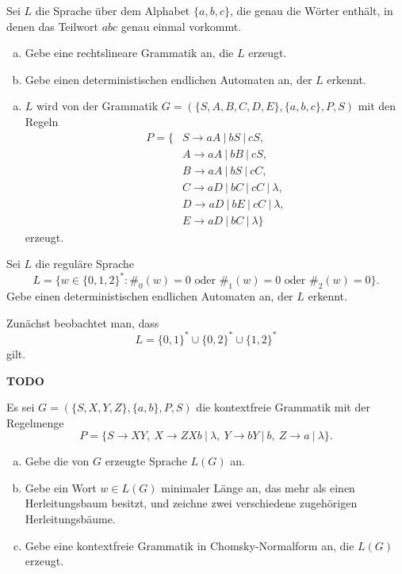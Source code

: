 \documentclass[german,headsepline]{scrartcl}
\theoremstyle{definition}
\begin{document}
	\begin{question}
		Sei $L$ die Sprache über dem Alphabet $\{a,b,c\}$, die genau die Wörter enthält,
		in denen das Teilwort $abc$ genau einmal vorkommt.
		\begin{enumerate}[(a)]
			\item Gebe eine rechtslineare Grammatik an, die $L$ erzeugt.
			\item Gebe einen deterministischen endlichen Automaten an, der $L$ erkennt.
		\end{enumerate}
	\end{question}
	\begin{solution}
		\begin{enumerate}[(a)]
			\item $L$ wird von der Grammatik $G=(\{S,A,B,C,D,E\},\{a,b,c\},P,S)$ mit den Regeln
				\begin{align*}
					P=\{&S\rightarrow aA~|~bS~|~cS, \\
					&A\rightarrow aA~|~bB~|~cS, \\
					&B\rightarrow aA~|~bS~|~cC, \\
					&C\rightarrow aD~|~bC~|~cC~|~\lambda, \\
					&D\rightarrow aD~|~bE~|~cC~|~\lambda, \\
					&E\rightarrow aD~|~bC~|~\lambda\}
				\end{align*}
				erzeugt.
		\end{enumerate}
	\end{solution}
	
	\begin{question}
		Sei $L$ die reguläre Sprache
		\[L=\{w\in\{0,1,2\}^*\colon\#_0(w)=0\text{ oder }\#_1(w)=0\text{ oder }\#_2(w)=0\}.\]
		Gebe einen deterministischen endlichen Automaten an, der $L$ erkennt.
	\end{question}
	\begin{solution}
		Zunächst beobachtet man, dass
		\[L=\{0,1\}^*\cup\{0,2\}^*\cup\{1,2\}^*\]
		gilt.
		
		\textbf{TODO}
	\end{solution}
	
	\begin{question}[subtitle={Klausur 2012}]
		Es sei $G=(\{S,X,Y,Z\},\{a,b\},P,S)$ die kontextfreie Grammatik mit der Regelmenge
		\[P=\{S\to XY,~X\to ZXb~|~\lambda,~Y\to bY~|~b,~Z\to a~|~\lambda\}.\]
		\begin{enumerate}[(a)]
			\item Gebe die von $G$ erzeugte Sprache $L(G)$ an.
			\item Gebe ein Wort $w\in L(G)$ minimaler Länge an,
				das mehr als einen Herleitungsbaum besitzt,
				und zeichne zwei verschiedene zugehörigen Herleitungsbäume.
			\item Gebe eine kontextfreie Grammatik in Chomsky-Normalform an, die $L(G)$ erzeugt.
		\end{enumerate}
	\end{question}
\end{document}
